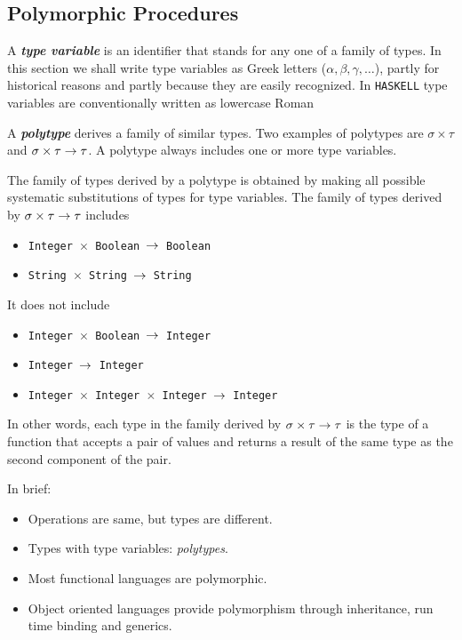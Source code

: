 \subsection{Polymorphic Procedures}
\label{subsec:Polymorp-procedure}

A \textit{\textbf{type variable}} is an identifier that stands for any one of a family of types. In this section we shall write type variables as Greek letters ($\alpha, \beta, \gamma, \ldots$), partly for historical reasons and partly because they are easily recognized. In \texttt{HASKELL} type variables are conventionally written as lowercase Roman

A \textit{\textbf{polytype}} derives a family of similar types. Two examples of polytypes are $\sigma \times \tau$ and $\sigma \times \tau \rightarrow \tau$. A polytype always includes one or more type variables.

The family of types derived by a polytype is obtained by making all possible systematic substitutions of types for type variables. The family of types derived by $\sigma \times \tau \rightarrow \tau$ includes
\begin{itemize}
  \item \texttt{Integer $\times$ Boolean $\rightarrow$ Boolean}
  \item \texttt{String $\times$ String $\rightarrow$ String}
\end{itemize}
It does not include
\begin{itemize}
  \item \texttt{Integer $\times$ Boolean $\rightarrow$ Integer}
  \item \texttt{Integer $\rightarrow$ Integer}
  \item \texttt{Integer $\times$ Integer $\times$ Integer $\rightarrow$ Integer}
\end{itemize}
In other words, each type in the family derived by $\sigma \times \tau \rightarrow \tau$ is the type of a function that accepts a pair of values and returns a result of the same type as the second component of the pair.

\noindent In brief:
\begin{itemize}
  \item Operations are same, but types are different.
  \item Types with type variables: \textit{polytypes}.
  \item Most functional languages are polymorphic.
  \item Object oriented languages provide polymorphism through inheritance, run time binding and generics.
\end{itemize} 
